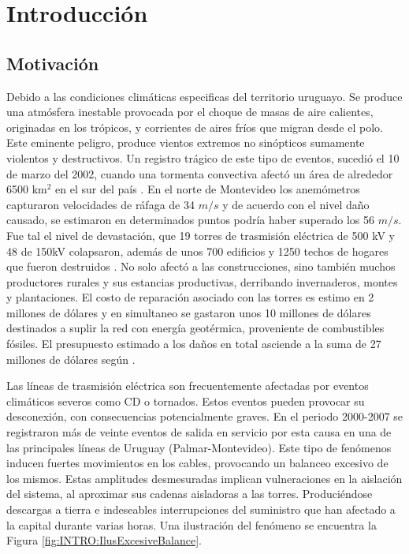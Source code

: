 \chapter{Introducción}\label{Cap:Introduccion}
 
\section{Motivación}
\linenumbers

Debido a las condiciones climáticas especificas del territorio uruguayo. Se produce una atmósfera inestable provocada por el choque de masas de aire calientes, originadas en los trópicos, y corrientes de aires fríos que migran desde el polo. Este eminente peligro, produce vientos extremos no sinópticos sumamente violentos y destructivos. Un registro trágico de este tipo de eventos, sucedió el 10 de marzo del 2002, cuando una tormenta convectiva afectó un área de alrededor  6500 km$^2$ en el sur del país \cite{tormenta2002}. En el norte de Montevideo los anemómetros capturaron velocidades de ráfaga de 34 $m/s$ y de acuerdo con el nivel daño causado, se estimaron en determinados puntos podría haber superado los 56 $m/s$. Fue tal el nivel de devastación, que 19 torres de trasmisión eléctrica de 500 kV y 48 de 150kV colapsaron, además de unos 700 edificios y 1250 techos de hogares que fueron destruidos \citep{duranona2015significance}. No solo afectó a las construcciones, sino también muchos productores rurales y sus estancias productivas, derribando invernaderos, montes y plantaciones. El costo de reparación asociado con las torres es estimo en 2 millones de dólares y en simultaneo se gastaron unos 10 millones de dólares destinados a suplir la red con energía geotérmica, proveniente de combustibles fósiles. El presupuesto estimado a los daños en total asciende a la suma de 27 millones de dólares según \cite{duranona2019first}.

Las líneas de trasmisión eléctrica son frecuentemente afectadas por eventos climáticos severos como \gls{CD} o tornados. Estos eventos pueden provocar su desconexión, con consecuencias potencialmente graves. En el periodo 2000-2007 se registraron más de veinte eventos de salida en servicio por esta causa en una de las principales líneas de Uruguay (Palmar-Montevideo). Este tipo de fenómenos inducen fuertes movimientos en los cables, provocando un balanceo excesivo de los mismos. Estas amplitudes desmesuradas implican vulneraciones en la aislación del sistema, al aproximar sus cadenas aisladoras a las torres. Produciéndose descargas a tierra e indeseables interrupciones del suministro que han afectado a la capital durante varias horas. Una ilustración del fenómeno se encuentra la Figura \ref{fig:INTRO:IlusExcesiveBalance}. 

